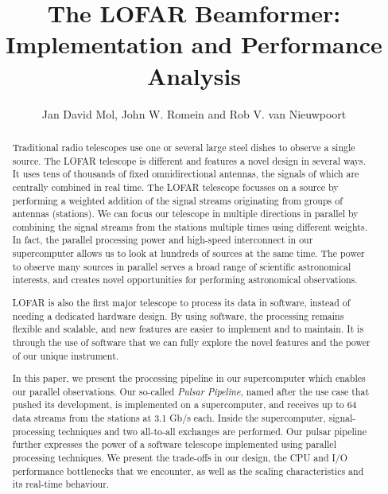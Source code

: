 \documentclass{llncs}
\begin{document}
\newcommand{\comment}[1]{}

\author{Jan David Mol, John W. Romein and Rob V. van Nieuwpoort}
\title{The LOFAR Beamformer: \\ Implementation and Performance Analysis}
\maketitle


\begin{abstract}
Traditional radio telescopes use one or several large steel dishes to observe a single source. The LOFAR telescope is different and features a novel design in several ways. It uses tens of thousands of fixed omnidirectional antennas, the signals of which are centrally combined in real time. The LOFAR telescope focusses on a source by performing a weighted addition of the signal streams originating from groups of antennas (stations). We can focus our telescope in multiple directions in parallel by combining the signal streams from the stations multiple times using different weights. In fact, the parallel processing power and high-speed interconnect in our supercomputer allows us to look at hundreds of sources at the same time. The power to observe many sources in parallel serves a broad range of scientific astronomical interests, and creates novel opportunities for performing astronomical observations.

LOFAR is also the first major telescope to process its data in software, instead of needing a dedicated hardware design. By using software, the processing remains flexible and scalable, and new features are easier to implement and to maintain. It is through the use of software that we can fully explore the novel features and the power of our unique instrument.

In this paper, we present the processing pipeline in our supercomputer which enables our parallel observations. Our so-called \emph{Pulsar Pipeline}, named after the use case that pushed its development, is implemented on a supercomputer, and receives up to 64 data streams from the stations at 3.1 Gb/s each. Inside the supercomputer, signal-processing techniques and two all-to-all exchanges are performed. Our pulsar pipeline further expresses the power of a software telescope implemented using parallel processing techniques. We present the trade-offs in our design, the CPU and I/O performance bottlenecks that we encounter, as well as the scaling characteristics and its real-time behaviour. 
      
\comment{
  
}
\end{abstract}
\end{document}
